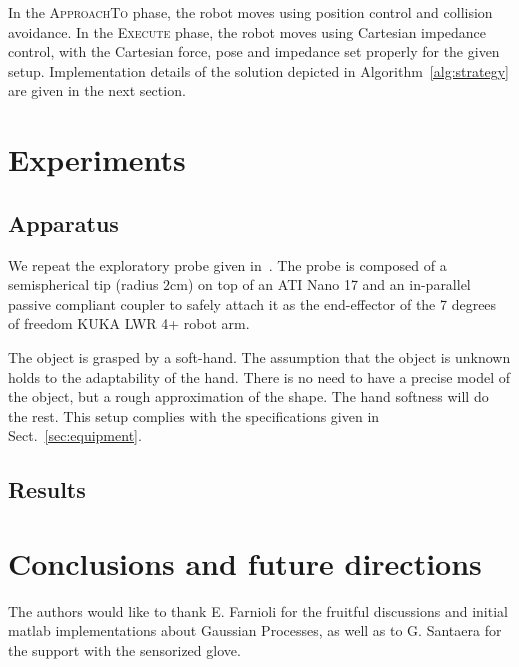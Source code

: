 \documentclass[twocolumn,draft,natbib]{svjour3}
\begin{document}
In the \textsc{ApproachTo} phase, the robot moves using position control and collision avoidance. In the \textsc{Execute} phase, the robot moves using Cartesian impedance control, with the Cartesian force, pose and impedance set properly for the given setup. Implementation details of the solution depicted in Algorithm~\ref{alg:strategy} are given in the next section.


\section{Experiments}
\label{sec:experiments}


\subsection{Apparatus}
\label{sec:apparatus}

We repeat the exploratory probe given in~\citet{Rosales2014Active}. The probe is composed of a semispherical tip (radius $2$cm) on top of an ATI Nano 17 and an in-parallel passive compliant coupler to safely attach it as the end-effector of the 7 degrees of freedom KUKA LWR 4+ robot arm.

The object is grasped by a soft-hand. The 
assumption that the object is unknown holds to the adaptability of the hand.
There is no need to have a precise model of the object, but a rough 
approximation of the shape. The hand softness will do the rest. This setup
complies with the specifications given in Sect.~\ref{sec:equipment}.

\subsection{Results}
\label{sec:results}

\section{Conclusions and future directions}
\label{sec:conclusions}


\begin{acknowledgements}
The authors would like to thank E. Farnioli for the fruitful discussions and 
initial matlab implementations about Gaussian Processes, as well as to G. 
Santaera for the support with the sensorized glove.
\end{acknowledgements}



\end{document}
